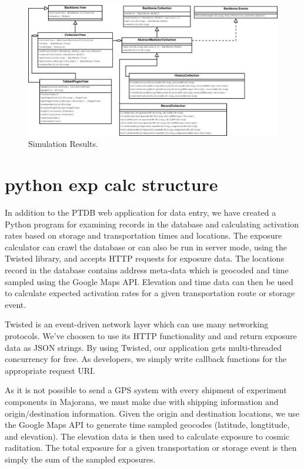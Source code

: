 \documentclass[journal]{IEEEtran}
\begin{document}
\begin{figure}[!p]
\centering
\includegraphics[width=7.5in]{Singletons}
\caption{Simulation Results.}
\label{singletons}
\end{figure}

\section{python exp calc structure}

In addition to the PTDB web application for data entry, we have created a Python program for
examining records in the database and calculating activation rates based on storage and 
transportation times and locations. The exposure calculator can crawl the database or can
also be run in server mode, using the Twisted library, and accepts HTTP requests for
exposure data. The locations record in the database contains address meta-data which
is geocoded and time sampled using the Google Maps API. Elevation and time data can
then be used to calculate expected activation rates for a given transportation route
or storage event.

Twisted is an event-driven network layer which can use many networking protocols. We've 
choosen to use its HTTP functionality and and return exposure data as JSON strings. By
using Twisted, our application gets multi-threaded concurrency for free. As developers,
we simply write callback functions for the appropriate request URI.

As it is not possible to send a GPS system with every shipment of experiment components
in Majorana, we must make due with shipping information and origin/destination information.
Given the origin and destination locations, we use the Google Maps API to generate time
sampled geocodes (latitude, longtitude, and elevation). The elevation data is then used
to calculate exposure to cosmic raditation. The total exposure for a given
transportation or storage event is then simply the sum of the sampled exposures.
\end{document}
